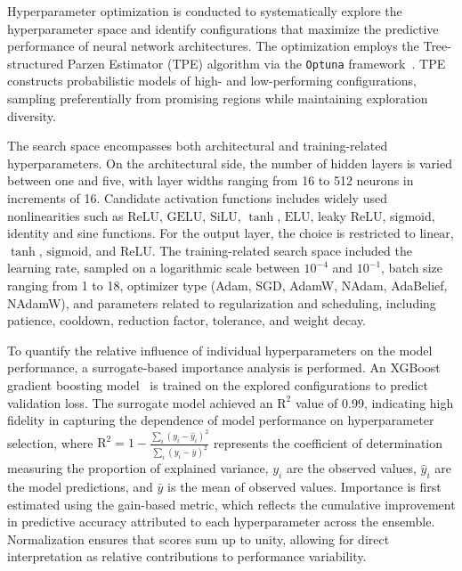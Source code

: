\documentclass{ieeeaccess}
\begin{document}
Hyperparameter optimization is conducted to systematically explore the hyperparameter space and identify configurations that maximize the predictive performance of neural network architectures. The optimization employs the Tree-structured Parzen Estimator (TPE) algorithm via the \texttt{Optuna} framework~\cite{akiba2019optuna}. TPE constructs probabilistic models of high- and low-performing configurations, sampling preferentially from promising regions while maintaining exploration diversity.


The search space encompasses both architectural and training-related hyperparameters. On the architectural side, the number of hidden layers is varied between one and five, with layer widths ranging from 16 to 512 neurons in increments of 16. Candidate activation functions includes widely used nonlinearities such as \(\text{ReLU}\), \(\text{GELU}\), \(\text{SiLU}\), \(\tanh\), \(\text{ELU}\), leaky \(\text{ReLU}\), sigmoid, identity and sine functions. For the output layer, the choice is restricted to \(\text{linear}\), \(\tanh\), \(\text{sigmoid}\), and \(\text{ReLU}\). The training-related search space included the learning rate, sampled on a logarithmic scale between \(10^{-4}\) and \(10^{-1}\), batch size ranging from 1 to 18, optimizer type (Adam, SGD, AdamW, NAdam, AdaBelief, NAdamW), and parameters related to regularization and scheduling, including patience, cooldown, reduction factor, tolerance, and weight decay.

To quantify the relative influence of individual hyperparameters on the model performance, a surrogate-based importance analysis is performed. An XGBoost gradient boosting model~\cite{Chen2016} is trained on the explored configurations to predict validation loss. The surrogate model achieved an \(\mathrm{R}^2\) value of 0.99, indicating high fidelity in capturing the dependence of model performance on hyperparameter selection, where \(\mathrm{R}^2 = 1 - \frac{\sum_i (y_i - \hat{y}_i)^2}{\sum_i (y_i - \bar{y})^2}\) represents the coefficient of determination measuring the proportion of explained variance, \(y_i\) are the observed values, \(\hat{y}_i\) are the model predictions, and \(\bar{y}\) is the mean of observed values. Importance is first estimated using the gain-based metric, which reflects the cumulative improvement in predictive accuracy attributed to each hyperparameter across the ensemble. Normalization ensures that scores sum up to unity, allowing for direct interpretation as relative contributions to performance variability.
\end{document}
